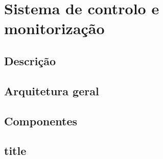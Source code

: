 


\chapter{Sistema de controlo e monitorização}

\section{Descrição}


\section{Arquitetura geral}


\section{Componentes}

\section{title}